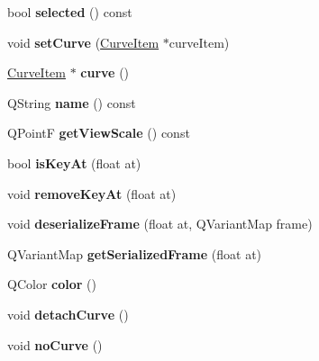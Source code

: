 \begin{DoxyCompactItemize}
\item 
\hypertarget{class_curve_variable_afc836ae4ed4143e05c0f372b7bd9957b}{
bool {\bfseries selected} () const }
\label{class_curve_variable_afc836ae4ed4143e05c0f372b7bd9957b}

\item 
\hypertarget{class_curve_variable_a028fdd64c8c7a98250444dfc1623ef74}{
void {\bfseries set\-Curve} (\hyperlink{class_curve_item}{\-Curve\-Item} $\ast$curve\-Item)}
\label{class_curve_variable_a028fdd64c8c7a98250444dfc1623ef74}

\item 
\hypertarget{class_curve_variable_a678c87175931f253335cf61624faa635}{
\hyperlink{class_curve_item}{\-Curve\-Item} $\ast$ {\bfseries curve} ()}
\label{class_curve_variable_a678c87175931f253335cf61624faa635}

\item 
\hypertarget{class_curve_variable_a30e56011b7cb4bd3e66f073eff3a2bc0}{
\-Q\-String {\bfseries name} () const }
\label{class_curve_variable_a30e56011b7cb4bd3e66f073eff3a2bc0}

\item 
\hypertarget{class_curve_variable_a41c3c7b604b9f2e1ae4d8f8cd903c8ec}{
\-Q\-Point\-F {\bfseries get\-View\-Scale} () const }
\label{class_curve_variable_a41c3c7b604b9f2e1ae4d8f8cd903c8ec}

\item 
\hypertarget{class_curve_variable_a184c8134321fe494c2cc47cc437cf7d8}{
bool {\bfseries is\-Key\-At} (float at)}
\label{class_curve_variable_a184c8134321fe494c2cc47cc437cf7d8}

\item 
\hypertarget{class_curve_variable_ac9ebf84266b0c4f49206aa1159de112b}{
void {\bfseries remove\-Key\-At} (float at)}
\label{class_curve_variable_ac9ebf84266b0c4f49206aa1159de112b}

\item 
\hypertarget{class_curve_variable_abec65aa48106a284ba4f6f61a468f009}{
void {\bfseries deserialize\-Frame} (float at, \-Q\-Variant\-Map frame)}
\label{class_curve_variable_abec65aa48106a284ba4f6f61a468f009}

\item 
\hypertarget{class_curve_variable_ae449e1145f26779eafa80fc3cbc83537}{
\-Q\-Variant\-Map {\bfseries get\-Serialized\-Frame} (float at)}
\label{class_curve_variable_ae449e1145f26779eafa80fc3cbc83537}

\item 
\hypertarget{class_curve_variable_aad735a624369bdf41ef4a02e50b88a8c}{
\-Q\-Color {\bfseries color} ()}
\label{class_curve_variable_aad735a624369bdf41ef4a02e50b88a8c}

\item 
\hypertarget{class_curve_variable_aa0b7db33146aae10146e639b744eb5b9}{
void {\bfseries detach\-Curve} ()}
\label{class_curve_variable_aa0b7db33146aae10146e639b744eb5b9}

\item 
\hypertarget{class_curve_variable_a55a0eeb5296c492ea7eaac68ad7fec8d}{
void {\bfseries no\-Curve} ()}
\label{class_curve_variable_a55a0eeb5296c492ea7eaac68ad7fec8d}

\end{DoxyCompactItemize}
